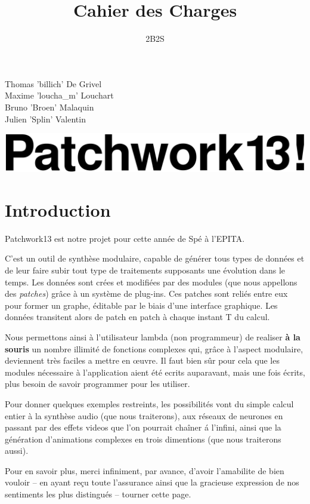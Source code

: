 \documentclass[14pt,a4paper]{article}
\title{\textbf{Cahier des Charges}}
\author{2B2S}
\begin{document}
\maketitle

\begin{center}
Thomas 'billich' De Grivel
\\
Maxime 'loucha\_m' Louchart
\\
Bruno 'Broen' Malaquin
\\
Julien 'Splin' Valentin
\\
\vspace{5cm}

\centerline{{\includegraphics{patchwork13.jpg}}}


\end{center}

\newpage

\tableofcontents

\newpage

\section{Introduction}
Patchwork13 est notre projet pour cette ann\'ee de Sp\'e \`a l'EPITA.\\
\par
 C'est un outil de synth\`ese modulaire, capable de g\'en\'erer tous types
de donn\'ees et de leur faire subir tout type de traitements supposants
une \'evolution dans le temps. Les donn\'ees sont cr\'ees et modifi\'ees 
par des modules (que nous appellons des \textsl{patches}) gr\^ace
 \`a un syst\`eme de plug-ins.
Ces patches sont reli\'es entre eux pour former un graphe,
\'editable par le biais d'une interface graphique. Les donn\'ees
 transitent alors de patch en patch \`a chaque instant T du calcul.\\
\par
Nous permettons ainsi \`a
l'utilisateur lambda (non programmeur) de realiser \textbf{\`a la souris}
 un nombre illimit\'e de fonctions complexes qui, gr\^ace \`a
 l'aspect modulaire, deviennent tr\`es 
faciles a mettre en \oe uvre. Il faut bien s\^ur pour cela que
les modules n\'ecessaire \`a l'application aient \'et\'e ecrits
auparavant, mais une fois \'ecrits, plus besoin de savoir programmer
pour les utiliser.\\
\par
Pour donner quelques exemples restreints, les possibilit\'es vont
 du simple calcul entier \`a la synth\`ese audio (que nous traiterons),
 aux r\'eseaux de neurones en passant par des effets videos que l'on
 pourrait cha\^iner \'a l'infini, ainsi que la g\'en\'eration d'animations
 complexes en trois dimentions (que nous traiterons aussi).\\
\par
Pour en savoir plus, merci infiniment, par avance, d'avoir l'amabilite
 de bien vouloir -- en ayant re\c{c}u toute l'assurance ainsi que la gracieuse
 expression de nos sentiments les plus distingu\'es --
 tourner cette page.
\end{document}
